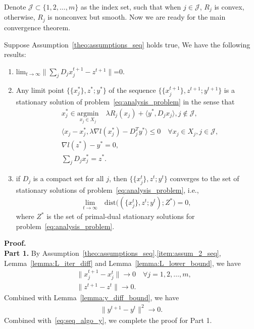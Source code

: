 Denote $\mathcal{J}\subset\{1,2,\ldots, m\}$ as the index set, such that when $ j\in\mathcal{J}$, $R_j$ is convex, otherwise, $R_j$ is nonconvex but smooth. Now we are ready for the main convergence theorem. 
\begin{theorem}\label{theo:convergence}
Suppose Assumption~\ref{theo:assumptions_seq} holds true, We have the following results:
\begin{enumerate}
    \item $\text{lim}_{t\rightarrow\infty}\|\sum_j D_jx_j^{t+1} - z^{t+1}\|$=0.\label{item:primal_cond_limit}
    \item Any limit point $\{\{x_j^*\}, z^*; y^*\}$ of the sequence $\{\{x_j^{t+1}\}, z^{t+1}; y^{t+1}\}$ is a stationary solution of problem~\eqref{eq:analysis_problem} in the sense that
    \begin{align}
        & x_j^* \in \underset{x_j\in X_j}{\text{argmin}}\quad \lambda R_j(x_j) + \langle y^*, D_jx_j\rangle, j\not\in\mathcal{J},\label{eq:cond_x_opt_conv}\\
        & \langle x_j - x_j^*, \lambda\nabla l(x_j^*) - D_j^T y^* \rangle\le 0\quad\forall x_j\in X_j, j\in\mathcal{J}, \label{eq:cond_x_opt_nonconv}\\
        & \nabla l(z^*) - y^* = 0,\label{eq:cond_dual}\\
        & \sum_jD_jx_j^* = z^*.\label{eq:cond_primal}
    \end{align}
    \item if $D_j$ is a compact set for all $j$, then $\{\{x_j^t\}, z^t; y^t\}$ converges to the set of stationary solutions of problem~\eqref{eq:analysis_problem}, i.e., 
    \begin{align}
        \underset{t\rightarrow\infty}{\text{lim}}\quad\text{dist}\big((\{x_j^t\}, z^t; y^t);Z^*\big) = 0,\nonumber
    \end{align}
    where $Z^*$ is the set of primal-dual stationary solutions for problem~\eqref{eq:analysis_problem}.
\end{enumerate}
\end{theorem}
{\bf Proof.} \\
{\bf Part 1. } By Assumption~\ref{theo:assumptions_seq}.\ref{item:assum_2_seq}, Lemma~\ref{lemma:L_iter_diff} and Lemma~\ref{lemma:L_lower_bound}, we have 
\begin{align}
    & \|x_j^{t+1} - x_j^t\|\rightarrow 0\quad\forall j=1,2,\ldots, m,\nonumber\\
    & \|z^{t+1} - z^t\|\rightarrow 0.\nonumber
\end{align}
Combined with Lemma~\ref{lemma:y_diff_bound}, we have 
\begin{align}
    \|y^{t+1}-y^t\|^2\rightarrow 0.\nonumber
\end{align}
Combined with~\eqref{eq:seq_algo_y}, we complete the proof for Part 1. 

